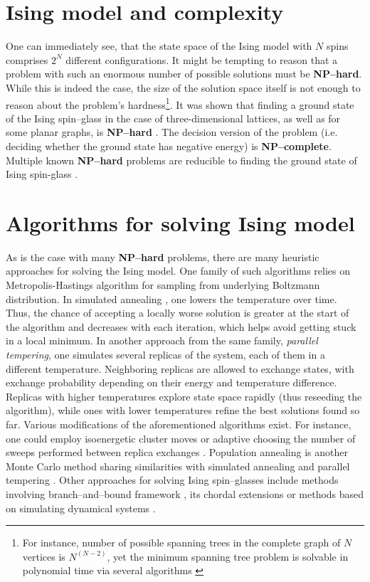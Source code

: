 \section{Ising model and complexity}

One can immediately see, that the state space of the Ising model with $N$ spins comprises $2^{N}$ different configurations. It might be tempting to reason that a problem with such an enormous number of possible solutions must be \textbf{NP--hard}. While this is indeed the case, the size of the solution space itself is not enough to reason about the problem's hardness\footnote{For instance, number of possible spanning trees in the complete graph of $N$ vertices is $N^{(N-2)}$, yet the minimum spanning tree problem is solvable in polynomial time via several algorithms \cite{clrs}}.
It was shown that finding a ground state of the Ising spin--glass in the case of three-dimensional lattices, as well as for some planar graphs,  is \textbf{NP--hard} \cite{barahoma}. The decision version of the problem (i.e. deciding whether the ground state has negative energy) is \textbf{NP--complete}. Multiple known \textbf{NP--hard} problems are reducible to finding the ground state of Ising spin-glass \cite{lucas}.

\section{Algorithms for solving Ising model}

As is the case with many \textbf{NP--hard} problems, there are many heuristic approaches for solving the Ising model. One family of such algorithms relies on Metropolis-Hastings \cite{beichl} algorithm for sampling from underlying Boltzmann distribution. In simulated annealing \cite{cook}, one lowers the temperature over time. Thus, the chance of accepting a locally worse solution is greater at the start of the algorithm and decreases with each iteration, which helps avoid getting stuck in a local minimum. In another approach from the same family, \emph{parallel tempering}, one simulates several replicas of the system, each of them in a different temperature. Neighboring replicas are allowed to exchange states, with exchange probability depending on their energy and temperature difference. Replicas with higher temperatures explore state space rapidly (thus reseeding the algorithm), while ones with lower temperatures refine the best solutions found so far. Various modifications of the aforementioned algorithms exist. For instance, one could employ isoenergetic cluster moves \cite{zhu} or adaptive choosing the number of sweeps performed between replica exchanges \cite{bittner}. Population annealing is another Monte Carlo method sharing similarities with simulated annealing and parallel tempering \cite{wang}. Other approaches for solving Ising spin--glasses include methods involving branch--and--bound framework \cite{rendl}, its chordal extensions \cite{baccari} or methods based on simulating dynamical systems \cite{sheldon}.

